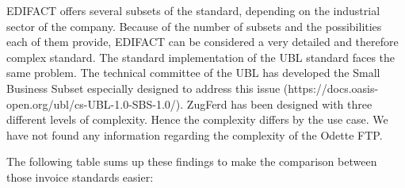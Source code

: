 EDIFACT offers several subsets of the standard, depending on the industrial sector of the company. Because of the number of subsets and the possibilities each of them provide, EDIFACT can be considered a very detailed and therefore complex standard. The standard implementation of the UBL standard faces the same problem. The technical committee of the UBL has developed the Small Business Subset especially designed to address this issue (https://docs.oasis-open.org/ubl/cs-UBL-1.0-SBS-1.0/). ZugFerd has been designed with three different levels of complexity. Hence the complexity differs by the use case. We have not found any information regarding the complexity of the Odette FTP.

The following table sums up these findings to make the comparison between those invoice standards easier:

